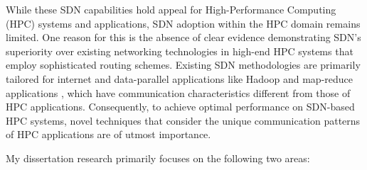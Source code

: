 While these SDN capabilities hold appeal for High-Performance Computing (HPC)
systems and applications, SDN adoption within the HPC domain remains limited.
One reason for this is the absence of clear evidence demonstrating SDN's
superiority over existing networking technologies in high-end HPC systems that
employ sophisticated routing schemes. Existing SDN methodologies are primarily
tailored for internet and data-parallel applications like Hadoop and map-reduce
applications \cite{he2016firebird}, which have communication characteristics different from those
of HPC applications. Consequently, to achieve optimal performance on SDN-based
HPC systems, novel techniques that consider the unique communication patterns of HPC
applications are of utmost importance. 

\begin{comment}
Many HPC applications involve simulating physical
processes across numerous time steps, where each step entails similar tasks.
This results in phased behavior characterized by alternating computation and
communication phases often
repeating across different time steps and being static, as known to application
developers \cite{faraj2002communication} \cite{hong2013achieving}. Leveraging such static communication information can enhance
SDN's ability to support communications effectively and perform tasks
efficiently. Considering these characteristics, I develop SDN techniques
tailored for HPC systems. Flow identification plays a crucial role in this
process, as accurately classifying flows is essential for achieving high
performance in an SDN-capable network. 

The focus of this work lies particularly on
identifying elephant flows \cite{he2016firebird}, which are flows with substantial data volumes,
as they typically dominate communication time in HPC applications. Subsequently,
we devise SDN-enhanced routing functions to adeptly schedule these elephant
flows and allocate optimal network resources. Building upon the first part of the work done 
on optimal system configurations, we will evaluate these new algorithms across
various interconnect topologies.  Such evaluations hold significant implications
for scientific computing, enabling researchers to harness the full potential of
HPC resources for groundbreaking discoveries across various fields.
\end{comment}

My dissertation research primarily focuses on the following two areas:

